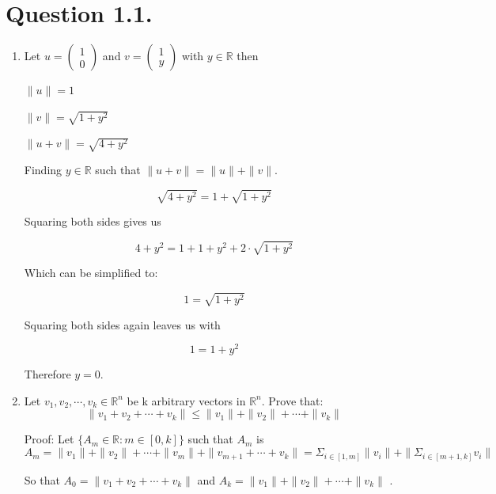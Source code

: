 \documentclass[11pt,a4paper]{article}
\newcommand{\R}{\mathbb{R}}
\begin{document}
\section*{Question 1.1.}
    \begin{enumerate}[label=\alph*.]
        \item  Let $u = \begin{pmatrix} 1 \\ 0 \end{pmatrix}$ and $v = \begin{pmatrix} 1 \\ y\end{pmatrix}$ with $y  \in \R$ then 

            $ \| u \| = 1$

            $\| v \| = \sqrt{1 + y^2}$

            $\| u + v \| = \sqrt{4 + y^2}$

            Finding $ y \in \R $ such that $\| u + v\| = \| u \| + \| v \| $.

            \[
                \sqrt{4 + y^2} = 1 + \sqrt{1 + y^2}
            \]
            
            Squaring both sides gives us
            
            \[
                4 + y^2 = 1 + 1 + y^2 + 2 \cdot \sqrt{1 + y^2}
            \]

            Which can be simplified to:

            \[
                1 = \sqrt{1 + y^2}
            \]

            Squaring both sides again leaves us with
            
            \[
                1 = 1 + y^2
            \]

            Therefore $ y = 0 $.

        \item Let $v_1 , v_2 , \cdots , v_k \in \R^n$ be k arbitrary vectors in $\R^n$. 
            Prove that:
                \[
                    \| v_1 + v_2 + \cdots + v_k \| \leq \|v_1 \| + \| v_2 \| + \cdots + \| v_k \|
                \]

            Proof:
            Let $\{A_m \in \R : m \in [0, k] \}$ such that $A_m$ is 
            \[
                A_m = \| v_1 \| + \| v_2 \|  + \cdots + \| v_m \| + \| v_{m + 1} + \cdots +  v_k \| = \Sigma_{i \in [1, m]} \| v_i \|  + \| \Sigma_{i \in [m + 1, k]} v_i\|
            \] 

            So that $A_0 = \|v_1 + v_2 + \cdots + v_k \|$ and $A_k = \| v_1 \| + \| v_2 \| + \cdots + \| v_k \|$ .


\end{enumerate}
\end{document}
